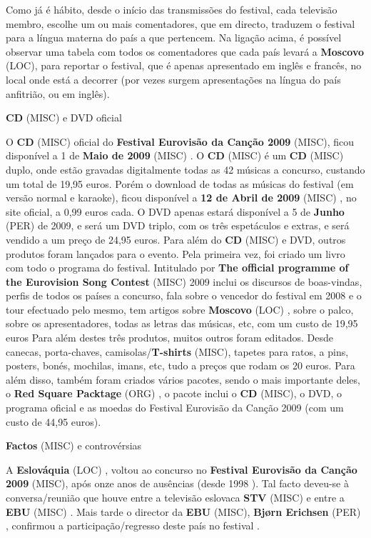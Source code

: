 \documentclass[12pt,a4paper]{article}
\begin{document}
Como já é hábito, desde o início das transmissões do festival, cada televisão membro, escolhe um ou mais comentadores, que em directo, traduzem o festival para a língua materna do país a que pertencem. Na ligação acima, é possível observar uma tabela com todos os comentadores que cada país levará a \textbf{Moscovo} (LOC), para reportar o festival, que é apenas apresentado em inglês e francês, no local onde está a decorrer (por vezes surgem apresentações na língua do país anfitrião, ou em inglês).



\textbf{CD} (MISC) e DVD oficial

O \textbf{CD} (MISC) oficial do \textbf{Festival Eurovisão da Canção 2009} (MISC), ficou disponível a 1 de \textbf{Maio de 2009} (MISC) . O \textbf{CD} (MISC) é um \textbf{CD} (MISC) duplo, onde estão gravadas digitalmente todas as 42 músicas a concurso, custando um total de 19,95 euros. Porém o download de todas as músicas do festival (em versão normal e karaoke), ficou disponível a \textbf{12 de Abril de 2009} (MISC) , no site oficial, a 0,99 euros cada. O DVD apenas estará disponível a 5 de \textbf{Junho} (PER) de 2009, e será um DVD triplo, com os três espetáculos e extras, e será vendido a um preço de 24,95 euros. Para além do \textbf{CD} (MISC) e DVD, outros produtos foram lançados para o evento. Pela primeira vez, foi criado um livro com todo o programa do festival. Intitulado por \textbf{The official programme of the Eurovision Song Contest} (MISC) 2009 inclui os discursos de boas-vindas, perfis de todos os países a concurso, fala sobre o vencedor do festival em 2008 e o tour efectuado pelo mesmo, tem artigos sobre \textbf{Moscovo} (LOC) , sobre o palco, sobre os apresentadores, todas as letras das músicas, etc, com um custo de 19,95 euros Para além destes três produtos, muitos outros foram editados. Desde canecas, porta-chaves, camisolas/\textbf{T-shirts} (MISC), tapetes para ratos, a pins, posters, bonés, mochilas, imans, etc, tudo a preços que rodam os 20 euros. Para além disso, também foram criados vários pacotes, sendo o mais importante deles, o \textbf{Red Square Packtage} (ORG) , o pacote inclui o \textbf{CD} (MISC), o DVD, o programa oficial e as moedas do Festival Eurovisão da Canção 2009 (com um custo de 44,95 euros).



\textbf{Factos} (MISC) e controvérsias

A \textbf{Eslováquia} (LOC) , voltou ao concurso no \textbf{Festival Eurovisão da Canção 2009} (MISC), após onze anos de ausências (desde 1998 ). Tal facto deveu-se à conversa/reunião que houve entre a televisão eslovaca \textbf{STV} (MISC) e entre a \textbf{EBU} (MISC) . Mais tarde o director da \textbf{EBU} (MISC), \textbf{Bjørn Erichsen} (PER) , confirmou a participação/regresso deste país no festival .
\end{document}
